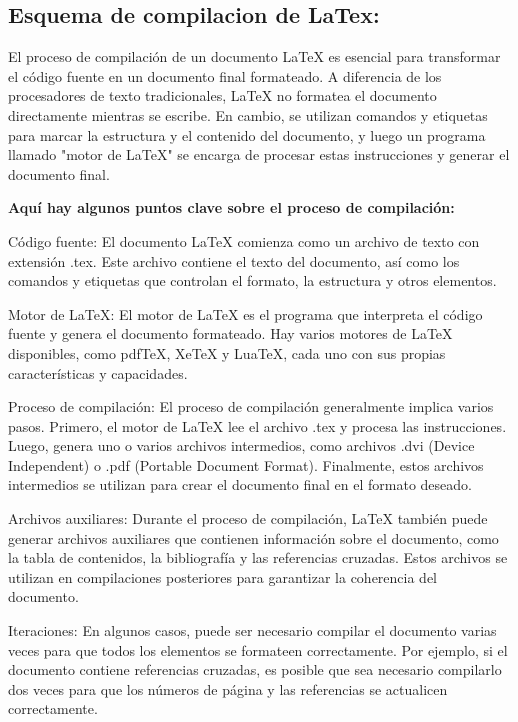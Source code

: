 \documentclass[12pt,twocolumn]{article}
\begin{document}
    \subsection{Esquema de compilacion de LaTex:}
    El proceso de compilación de un documento LaTeX es esencial para transformar el código fuente en un documento final formateado. 
    A diferencia de los procesadores de texto tradicionales, LaTeX no formatea el documento directamente mientras se escribe. 
    En cambio, se utilizan comandos y etiquetas para marcar la estructura y el contenido del documento, y luego un programa llamado "motor de LaTeX" se encarga de procesar estas instrucciones y generar el documento final.
    
{\raggedleft \textbf{Aquí hay algunos puntos clave sobre el proceso de compilación:}}

    Código fuente: El documento LaTeX comienza como un archivo de texto con extensión .tex. Este archivo contiene el texto del documento, así como los comandos y etiquetas que controlan el formato, la estructura y otros elementos.

    Motor de LaTeX: El motor de LaTeX es el programa que interpreta el código fuente y genera el documento formateado. Hay varios motores de LaTeX disponibles, como pdfTeX, XeTeX y LuaTeX, cada uno con sus propias características y capacidades.

    Proceso de compilación: El proceso de compilación generalmente implica varios pasos. Primero, el motor de LaTeX lee el archivo .tex y procesa las instrucciones. Luego, genera uno o varios archivos intermedios, como archivos .dvi (Device Independent) o .pdf (Portable Document Format). Finalmente, estos archivos intermedios se utilizan para crear el documento final en el formato deseado.

    Archivos auxiliares: Durante el proceso de compilación, LaTeX también puede generar archivos auxiliares que contienen información sobre el documento, como la tabla de contenidos, la bibliografía y las referencias cruzadas. Estos archivos se utilizan en compilaciones posteriores para garantizar la coherencia del documento.

    Iteraciones: En algunos casos, puede ser necesario compilar el documento varias veces para que todos los elementos se formateen correctamente. Por ejemplo, si el documento contiene referencias cruzadas, es posible que sea necesario compilarlo dos veces para que los números de página y las referencias se actualicen correctamente.
\end{document}
